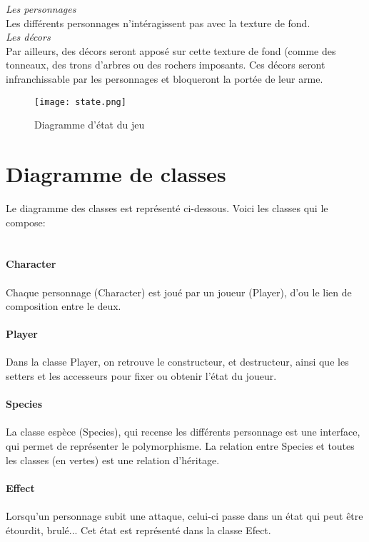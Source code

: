 \documentclass[a4paper,12pt]{report}
\begin{document}
	\indent \textit{Les personnages} \\ Les différents personnages n'intéragissent pas avec la texture de fond. \\
	
	\indent \textit{Les décors} \\ Par ailleurs, des décors seront apposé sur cette texture de fond (comme des tonneaux, des trons d'arbres ou des rochers imposants. Ces décors seront infranchissable par les personnages et bloqueront la portée de leur arme.
	



	\begin{landscape}
    	\begin{figure}[h!]
    		\centering
    		\texttt{[image: state.png]}
    		\caption{Diagramme d'état du jeu}
    	\end{figure}
	\end{landscape}
	
	
	
	\section{Diagramme de classes}
	
	
	Le diagramme des classes est représenté ci-dessous. Voici les classes qui le compose: \\ \\ \\ 
    \textbf{Character} \\ \\ 
    Chaque personnage (Character) est joué par un joueur (Player), d'ou le lien de composition entre le deux. \\ \\
    \textbf{Player} \\ \\ 
    Dans la classe Player, on retrouve le constructeur, et destructeur, ainsi que les setters et les accesseurs pour fixer ou obtenir l'état du joueur. \\ \\
    \textbf{Species} \\ \\
    La classe espèce (Species), qui recense les différents personnage est une interface, qui permet de représenter le polymorphisme. La relation entre Species et toutes les classes (en vertes) est une relation d'héritage. \\ \\
    \textbf{Effect} \\ \\
    Lorsqu'un personnage subit une attaque, celui-ci passe dans un état qui peut être étourdit, brulé... Cet état est représenté dans la classe Efect.
    
\end{document}
